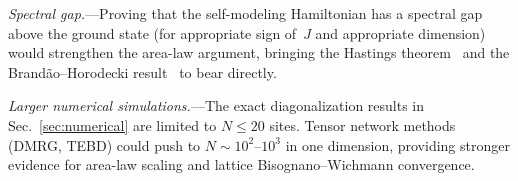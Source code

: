 \emph{Spectral gap.}---Proving that the self-modeling Hamiltonian has a
spectral gap above the ground state (for appropriate sign of~$J$ and
appropriate dimension) would strengthen the area-law argument, bringing
the Hastings theorem~\cite{Hastings2007} and the Brand\~ao--Horodecki
result~\cite{BrandaoHorodecki2013} to bear directly.

\emph{Larger numerical simulations.}---The exact diagonalization results
in Sec.~\ref{sec:numerical} are limited to $N \leq 20$ sites.  Tensor
network methods (DMRG, TEBD) could push to $N \sim 10^2$--$10^3$ in one
dimension, providing stronger evidence for area-law scaling and lattice
Bisognano--Wichmann convergence.
